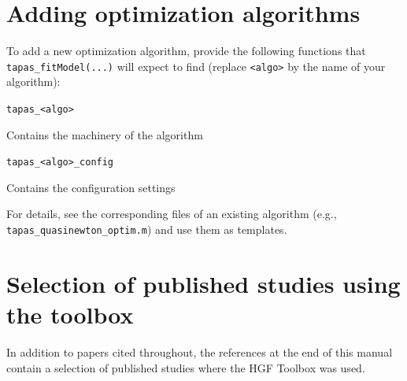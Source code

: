 \documentclass[11pt,a4paper]{article}
\numberwithin{equation}{section}
\begin{document}
\section{Adding optimization algorithms}
\label{sec:addoptalgo}

To add a new optimization algorithm, provide the following functions
that \linebreak\texttt{tapas\_fitModel(...)} will expect to find (replace
\texttt{<algo>} by the name of your algorithm):

\begin{description}
\item{\texttt{tapas\_<algo>}}

Contains the machinery of the algorithm

\item{\texttt{tapas\_<algo>\_config}}

Contains the configuration settings
\end{description}

For details, see the corresponding files of an existing algorithm
(e.g., \linebreak\texttt{tapas\_quasinewton\_optim.m}) and use them as
templates.

\section{Selection of published studies using the toolbox}
\label{sec:pubstud}

In addition to papers cited throughout, the references at
the end of this manual contain a selection of published studies where
the HGF Toolbox was used.

\nocite{*}


\end{document}
